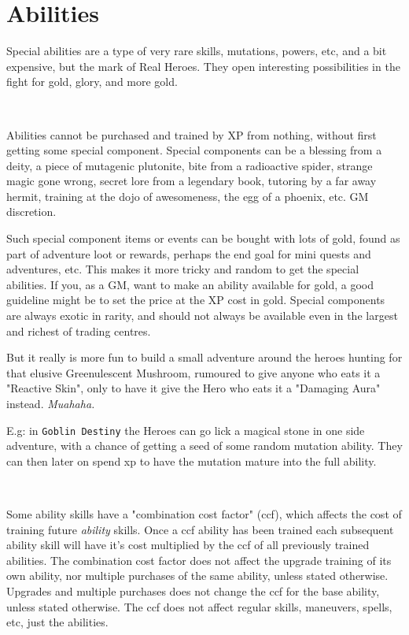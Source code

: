 

\section*{Abilities}

Special abilities are a type of very rare skills, mutations, powers, etc, and a bit expensive, but the mark of Real Heroes. They open interesting possibilities in the fight for gold, glory, and more gold.

\

Abilities cannot be purchased and trained by XP from nothing, without first getting some special component. Special components can be a blessing from a deity, a piece of mutagenic plutonite, bite from a radioactive spider, strange magic gone wrong, secret lore from a legendary book, tutoring by a far away hermit, training at the dojo of awesomeness, the egg of a phoenix, etc. GM discretion.

Such special component items or events can be bought with lots of gold, found as part of adventure loot or rewards, perhaps the end goal for mini quests and adventures, etc. This makes it more tricky and random to get the special abilities. If you, as a GM, want to make an ability available for gold, a good guideline might be to set the price at the XP cost in gold. Special components are always exotic in rarity, and should not always be available even in the largest and richest of trading centres.

But it really is more fun to build a small adventure around the heroes hunting for that elusive Greenulescent Mushroom, rumoured to give anyone who eats it a "Reactive Skin", only to have it give the Hero who eats it a "Damaging Aura" instead. \emph{Muahaha.}

E.g: in \texttt{Goblin Destiny} the Heroes can go lick a magical stone in one side adventure, with a chance of getting a seed of some random mutation ability. They can then later on spend xp to have the mutation mature into the full ability.

\

Some ability skills have a "combination cost factor" (ccf), which affects the cost of training future \emph{ability} skills. Once a ccf ability has been trained each subsequent ability skill will have it's cost multiplied by the ccf of all previously trained abilities. The combination cost factor does not affect the upgrade training of its own ability, nor multiple purchases of the same ability, unless stated otherwise. Upgrades and multiple purchases does not change the ccf for the base ability, unless stated otherwise. The ccf does not affect regular skills, maneuvers, spells, etc, just the abilities.

